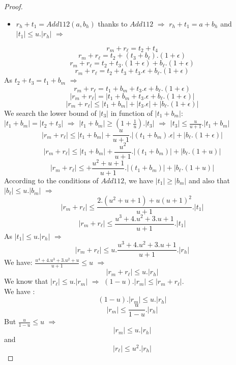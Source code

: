 \begin{proof}
\begin{itemize}
\item $r_h+t_1 = Add112(a,b_h)$ thanks to $Add112$ $\Rightarrow$ $r_h+t_1 = a+b_h$ and $ \lvert t_1 \rvert \le u. \lvert r_h \rvert$ $\Rightarrow$
\end{itemize}
$$r_m+r_{\ell} = t_2+ t_4$$
$$r_m+r_{\ell} = t_2 + (t_3 + b_{\ell}).(1+\epsilon)$$
$$r_m+r_{\ell} = t_2 + t_3.(1+\epsilon)+ b_{\ell}.(1+\epsilon)$$
$$r_m+r_{\ell} = t_2 + t_3+ t_3.\epsilon + b_{\ell}.(1+\epsilon)$$
As $t_2+t_3 = t_1+b_m$ $\Rightarrow$
$$r_m+r_{\ell} = t_1+b_m+ t_3.\epsilon + b_{\ell}.(1+\epsilon)$$
$$ \lvert r_m+r_{\ell} \rvert  = \lvert  t_1+b_m+ t_3.\epsilon + b_{\ell}.(1+\epsilon) \lvert$$
$$\lvert r_m+r_{\ell} \rvert  \le \lvert  t_1+b_m \rvert + \lvert t_3.\epsilon \rvert + \lvert b_{\ell}.(1+\epsilon) \lvert$$ 
We search the lower bound of $\lvert t_3 \rvert $ in function of $\lvert  t_1+b_m \rvert$:\\
$\lvert t_1 + b_m \rvert = \lvert t_2 + t_3 \rvert $ $\Rightarrow$ $\lvert t_1 + b_m \rvert \ge (1 + \frac{1}{u}).\lvert  t_3 \rvert $ $\Rightarrow$ $\lvert t_3 \rvert \le \frac{u}{u+1}.\lvert  t_1 + b_m \rvert $
$$\lvert r_m+r_{\ell} \rvert  \le \lvert  t_1+b_m \rvert +\frac{u}{u+1}. \lvert (t_1 + b_m) .\epsilon \rvert + \lvert b_{\ell}.(1+\epsilon) \lvert$$
$$\lvert r_m+r_{\ell} \rvert  \le \lvert  t_1+b_m \rvert +\frac{u^2}{u+1}. \lvert (t_1 + b_m) \rvert + \lvert b_{\ell}.(1+ u) \lvert$$
$$\lvert r_m+r_{\ell} \rvert  \le +\frac{u^2+u+1}{u+1}. \lvert (t_1 + b_m) \rvert + \lvert b_{\ell}.(1+ u) \lvert$$ 
According to the conditions of $Add112$, we have $\lvert t_1 \rvert \ge \lvert b_m \rvert $ and also that $\lvert b_{\ell} \rvert \le u. \lvert b_m \rvert $ $\Rightarrow$
$$\lvert r_m+r_{\ell} \rvert  \le \frac{2.(u^2+u+1)+u(u+1)^2}{u+1}.\lvert  t_1 \rvert$$
$$\lvert r_m+r_{\ell} \rvert  \le \frac{u^3+4.u^2+3.u+1}{u+1}.\lvert  t_1 \rvert$$
As $ \lvert t_1 \rvert \le u. \lvert r_h \rvert $ $\Rightarrow$
$$\lvert r_m+r_{\ell} \rvert  \le u.\frac{u^3+4.u^2+3.u+1}{u+1}.\lvert  r_h \rvert$$
 We have: $\frac{u^4+4.u^3+3.u^2+u}{u+1} \le u$ $\Rightarrow$
$$\lvert r_m+r_{\ell} \rvert  \le u.\lvert  r_h \rvert$$
We know that $ \lvert r_{\ell} \rvert \le u. \lvert r_m \rvert$ $\Rightarrow$ $(1 - u). \lvert r_m \rvert \le \lvert r_m + r_{\ell} \rvert $.\\
We have :
$$(1 - u).\lvert r_m \rvert  \le u.\lvert  r_h \rvert$$
$$\lvert r_m \rvert  \le \frac{u}{1-u}.\lvert  r_h \rvert$$
But $\frac{u}{1-u} \le u$ $\Rightarrow$
$$\lvert r_m \rvert  \le u.\lvert  r_h \rvert$$
and
$$\lvert r_{\ell} \rvert  \le u^2.\lvert  r_h \rvert$$
\end{proof}

